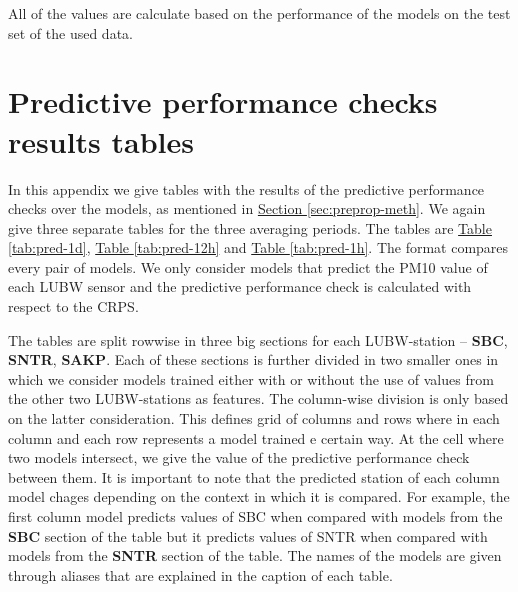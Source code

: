\documentclass[12pt,a4paper,twoside]{scrartcl}
\numberwithin{equation}{section}
\newcommand{\refsec}[1]{\hyperref[#1]{Section \ref*{#1}}}
\newcommand{\reftab}[1]{\hyperref[#1]{Table \ref*{#1}}}
\newcounter{mypagecount}%
\newenvironment{interlude}{%
  \clearpage
  \setcounter{mypagecount}{\value{page}}%
  \thispagestyle{empty}%
  \pagestyle{empty}%
}{%
  \clearpage
  \setcounter{page}{\value{mypagecount}}%
}
\let\chapter=\section %
\begin{document}
\begin{interlude}
\begin{appendices}
    All of the values are calculate based on the performance of the models on the test set of the used data.
    
    \begin{table}
      \centering
      \label{tab:res-1d}
    \end{table}

    \begin{table}
      \centering
      \label{tab:res-12h}
    \end{table}

    \begin{table}
      \centering
      \label{tab:res-1h}
    \end{table}
    \clearpage
    \chapter{Predictive performance checks results tables}\label{app:e}
    In this appendix we give tables with the results of the predictive performance checks over the models, as mentioned in \refsec{sec:preprop-meth}. We again give three separate tables for the three averaging periods. The tables are \reftab{tab:pred-1d}, \reftab{tab:pred-12h} and \reftab{tab:pred-1h}. The format compares every pair of models. We only consider models that predict the PM10 value of each LUBW sensor and the predictive performance check is calculated with respect to the CRPS.
    
    The tables are split rowwise in three big sections for each LUBW-station -- \textbf{SBC}, \textbf{SNTR}, \textbf{SAKP}. Each of these sections is further divided in two smaller ones in which we consider models trained either with or without the use of values from the other two LUBW-stations as features. The column-wise division is only based on the latter consideration. This defines grid of columns and rows where in each column and each row represents a model trained e certain way. At the cell where two models intersect, we give the value of the predictive performance check between them. It is important to note that the predicted station of each column model chages depending on the context in which it is compared. For example, the first column model predicts values of SBC when compared with models from the \textbf{SBC} section of the table but it predicts values of SNTR when compared with models from the \textbf{SNTR} section of the table. The names of the models are given through aliases that are explained in the caption of each table.
    

\end{appendices}
\end{interlude}
\end{document}
